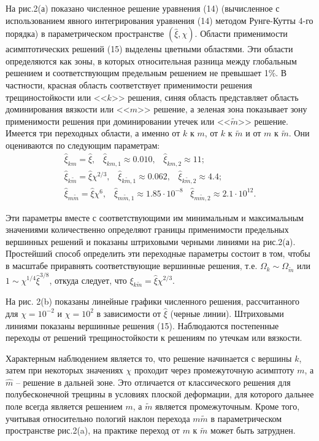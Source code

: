 \documentclass[a4paper, 12pt]{article}
\newcommand{\beq}{\begin{equation}}
\newcommand{\eeq}{\end{equation}}
\begin{document}
На рис.2(а) показано численное решение уравнения (14) (вычисленное с использованием явного интегрирования уравнения (14) методом Рунге-Кутты 4-го порядка) в параметрическом пространстве $\left(\hat{\xi},\chi\right)$.
Области применимости асимптотических решений (15) выделены цветными областями.
Эти области определяются как зоны, в которых относительная разница между глобальным решением и соответствующим предельным решением не превышает 1\%.
В частности, красная область соответствует применимости решения трещиностойкости или <<$k$>> решения, синяя область представляет область доминирования вязкости или <<$m$>> решение, а зеленая зона показывает зону применимости решения при доминировании утечек или <<$\tilde{m}$>> решение.
Имеется три переходных области, а именно от $k$ к $m$, от $k$ к $\tilde{m}$ и от $m$ к $\tilde{m}$.
Они оцениваются по следующим параметрам:
\beq
\begin{gathered}
\hat{\xi}_{km}=\hat{\xi},\,\,\,\,\,
\hat{\xi}_{km,1}\approx0.010,\,\,\,\,\,
\hat{\xi}_{km,2}\approx11;\\
\hat{\xi}_{k\tilde{m}}=\hat{\xi}\chi^{2/3},\,\,\,\,\,
\hat{\xi}_{k\tilde{m},1}\approx0.062,\,\,\,\,\,
\hat{\xi}_{k\tilde{m},2}\approx4.4;\\
\hat{\xi}_{m\tilde{m}}=\hat{\xi}\chi^6,\,\,\,\,\,
\hat{\xi}_{m\tilde{m},1}\approx1.85\cdot10^{-8}\,\,\,\,\,
\hat{\xi}_{m\tilde{m},2}\approx2.1\cdot10^{12}.
\end{gathered}
\eeq

Эти параметры вместе с соответствующими им минимальным и максимальным значениями количественно определяют границы применимости предельных вершинных решений и показаны штриховыми черными линиями на рис.2(а).
Простейший способ определить эти переходные параметры состоит в том, чтобы в масштабе приравнять соответствующие вершинные решения, т.е. $\Omega_k\sim\Omega_{\tilde{m}}$ или $1\sim\chi^{1/4}\hat{\xi}^{3/8}$, откуда следует, что $\xi_{k\tilde{m}}=\hat{\xi}\chi^{2/3}$.

На рис. 2(b) показаны линейные графики численного решения, рассчитанного для $\chi=10^{-2}$ и $\chi=10^2$ в зависимости от $\hat{\xi}$ (черные линии).
Штриховыми линиями показаны вершинные решения (15).
Наблюдаются постепенные переходы от решений трещиностойкости к решениям по утечкам или вязкости.

Характерным наблюдением является то, что решение начинается с вершины $k$, затем при некоторых значениях $\chi$ проходит через промежуточную асимптоту $m$, а $\hat{m}$ -- решение в дальней зоне.
Это отличается от классического решения для полубесконечной трещины в условиях плоской деформации, для которого дальнее поле всегда является решением $m$, а $\tilde{m}$ является промежуточным.
Кроме того, учитывая относительно пологий наклон перехода $m\tilde{m}$ в параметрическом пространстве рис.2(a), на практике переход от $m$ к $\tilde{m}$ может быть затруднен.
\end{document}
